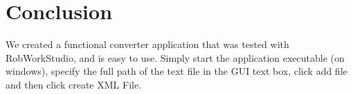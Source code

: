 \section{Conclusion}
\label{sec:conclusion}

We created a functional converter application that was tested with RobWorkStudio, and is easy to use. Simply start the application executable (on windows), specify the full path of the text file in the GUI text box, click add file and then click create XML File.